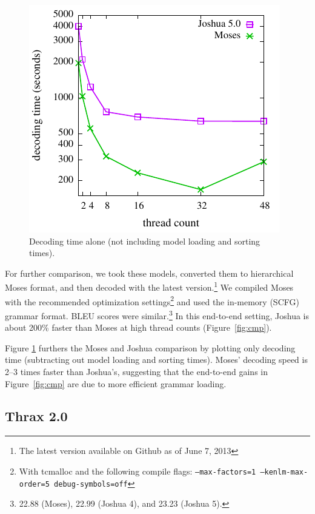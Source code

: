 \documentclass[11pt]{article}
\begin{document}
\begin{figure}[!t]
  \begin{center}
    \includegraphics[width=0.99\linewidth]{plots/decoding-only.pdf}
  \end{center}
  \caption{Decoding time alone (not including model loading and
    sorting times).}
  \label{fig:decoding-only}
\end{figure}

For further comparison, we took these models, converted them to
hierarchical Moses format, and then decoded with the latest
version.\footnote{The latest version available on Github as of June 7,
  2013} We compiled Moses with the recommended optimization
settings\footnote{With tcmalloc and the following compile flags:
  \texttt{--max-factors=1 --kenlm-max-order=5 debug-symbols=off}} and
used the in-memory (SCFG) grammar format.  BLEU scores were
similar.\footnote{22.88 (Moses), 22.99 (Joshua 4), and 23.23 (Joshua
  5).}  In this end-to-end setting, Joshua is about 200\% faster than
Moses at high thread counts (Figure~\ref{fig:cmp}).

Figure \ref{fig:decoding-only} furthers the Moses and Joshua
comparison by plotting only decoding time (subtracting
out model loading and sorting times).  Moses' decoding speed is 2--3
times faster than Joshua's, suggesting that the end-to-end gains in
Figure~\ref{fig:cmp} are due to more efficient grammar loading.

\subsection{Thrax 2.0}
\label{sec:thrax}
\end{document}
